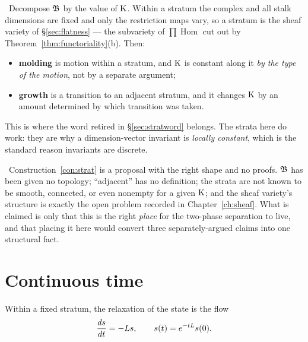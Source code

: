 \begin{construction}\label{con:strat}
\Proposed\ Decompose $\mathfrak{B}$ by the value of $\mathrm{K}$. Within a stratum the
complex and all stalk dimensions are fixed and only the restriction maps vary,
so a stratum is the sheaf variety of \S\ref{sec:flatness} --- the subvariety
of $\prod\operatorname{Hom}$ cut out by Theorem~\ref{thm:functoriality}(b).
Then:
\begin{itemize}
  \item \textbf{molding} is motion within a stratum, and $\mathrm{K}$ is constant
    along it \emph{by the type of the motion}, not by a separate argument;
  \item \textbf{growth} is a transition to an adjacent stratum, and it changes
    $\mathrm{K}$ by an amount determined by which transition was taken.
\end{itemize}
\end{construction}

This is where the word retired in \S\ref{sec:stratword} belongs. The strata
here do work: they are why a dimension-vector invariant is \emph{locally
constant}, which is the standard reason invariants are discrete.

\begin{hon}\Hon
\Proposed\ Construction~\ref{con:strat} is a proposal with the right shape and
no proofs. $\mathfrak{B}$ has been given no topology; ``adjacent'' has no definition;
the strata are not known to be smooth, connected, or even nonempty for a given
$\mathrm{K}$; and the sheaf variety's structure is exactly the open problem
recorded in Chapter~\ref{ch:sheaf}. What is claimed is only that this is the
right \emph{place} for the two-phase separation to live, and that placing it
here would convert three separately-argued claims into one structural fact.
\end{hon}

\section{Continuous time}

\begin{definition}\label{def:heat}
Within a fixed stratum, the relaxation of the state is the flow
\begin{equation}\label{eq:heat}
  \frac{ds}{dt}=-L s,\qquad s(t)=e^{-tL}s(0).
\end{equation}
\end{definition}

